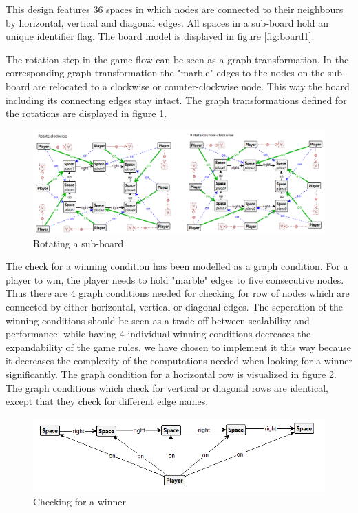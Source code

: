 This design features 36 spaces in which nodes are connected to their neighbours by horizontal, vertical and diagonal edges.
All spaces in a sub-board hold an unique identifier flag.
The board model is displayed in figure \ref{fig:board1}.

\vspace{6pt}

The rotation step in the game flow can be seen as a graph transformation.
In the corresponding graph transformation the "marble" edges to the nodes on the sub-board are relocated to a clockwise or counter-clockwise node.
This way the board including its connecting edges stay intact.
The graph transformations defined for the rotations are displayed in figure \ref{fig:rotate1}.

\begin{figure}[!h]
    \centering
    \includegraphics[scale=0.5,clip]{Images/rotate1.png}
    \caption{Rotating a sub-board}
    \label{fig:rotate1}
\end{figure}

\vspace{6pt}

The check for a winning condition has been modelled as a graph condition.
For a player to win, the player needs to hold "marble" edges to five consecutive nodes.
Thus there are 4 graph conditions needed for checking for row of nodes which are connected by either horizontal, vertical or diagonal edges.
The seperation of the winning conditions should be seen as a trade-off between scalability and performance: while having 4 individual winning conditions decreases the expandability of the game rules, we have chosen to implement it this way because it decreases the complexity of the computations needed when looking for a winner significantly.
The graph condition for a horizontal row is visualized in figure \ref{fig:endgame1}.
The graph conditions which check for vertical or diagonal rows are identical, except that they check for different edge names.

\begin{figure}[!h]
    \centering
    \includegraphics[scale=0.5,clip]{Images/endgame1.png}
    \caption{Checking for a winner}
    \label{fig:endgame1}
\end{figure}

